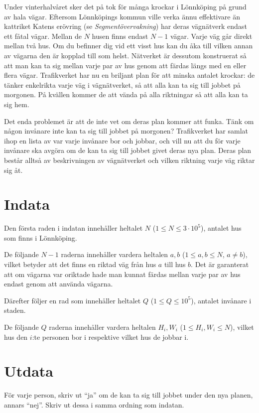 
\noindent
Under vinterhalvåret sker det på tok för många krockar i Lönnköping på grund av hala vägar. 
Eftersom Lönnköpings kommun ville verka ännu effektivare än kattriket Katens erövring (se \textit{Segmentövervakning})
har deras vägnätverk endast ett fåtal vägar. Mellan de $N$ husen finns endast $N-1$ vägar.
Varje väg går direkt mellan två hus. Om du befinner dig vid ett visst hus kan du åka till vilken
annan av vägarna den är kopplad till som helst. Nätverket är dessutom konstruerat så att
man kan ta sig mellan varje par av hus genom att färdas längs med en eller flera vägar.
Trafikverket har nu en briljant plan för att minska antalet krockar: de tänker enkelrikta
varje väg i vägnätverket, så att alla kan ta sig till jobbet på morgonen. På kvällen
kommer de att vända på alla riktningar så att alla kan ta sig hem. 

Det enda problemet är att de inte vet om deras plan kommer att funka. Tänk om någon invånare
inte kan ta sig till jobbet på morgonen? Trafikverket har samlat ihop en lista av var varje
invånare bor och jobbar, och vill nu att du för varje invånare ska avgöra om de kan ta sig
till jobbet givet deras nya plan. Deras plan består alltså av beskrivningen av vägnätverket och
vilken riktning varje väg riktar sig åt.

\section*{Indata}
Den första raden i indatan innehåller heltalet $N$ ($1 \le N \le 3 \cdot 10^5$), antalet hus
som finns i Lönnköping.

De följande $N-1$ raderna innehåller vardera heltalen $a,b$ ($1 \leq a,b \leq N$, $a \neq b$),
vilket betyder att det finns en riktad väg från hus $a$ till hus $b$. Det är garanterat
att om vägarna var oriktade hade man kunnat färdas mellan varje par av hus endast genom att använda
vägarna.

Därefter följer en rad som innehåller heltalet $Q$ ($1 \leq Q \leq 10^5$), antalet invånare i
staden.

De följande $Q$ raderna innehåller vardera heltalen $H_i,W_i$ ($1 \leq H_i,W_i \leq N$), vilket hus
den $i$:te personen bor i respektive vilket hus de jobbar i.

\section*{Utdata}
För varje person, skriv ut ``ja'' om de kan ta sig till jobbet under den nya planen, annars
``nej''. Skriv ut dessa i samma ordning som indatan.

